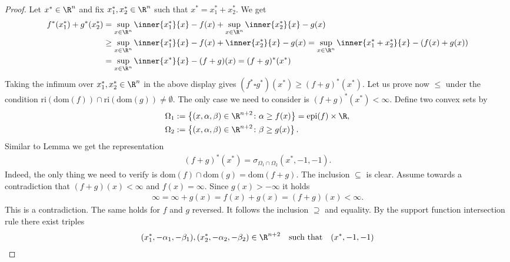 \begin{proof}
  Let $x^*\in\R^n$ and fix $x_1^*,x_2^*\in\R^n$ such that
  $x^*=x^*_1+x^*_2$.
  We get
  \begin{align*}
    f^*(x^*_1)+g^*(x^*_2)
    &=
    \sup_{x\in\R^n}
    \inner{x^*_1}{x}-f(x)
    +
    \sup_{x\in\R^n}
    \inner{x^*_2}{x}-g(x)
    \\
    &\ge
    \sup_{x\in\R^n}
    \inner{x^*_1}{x}-f(x)
    +
    \inner{x^*_2}{x}-g(x)
    =
    \sup_{x\in\R^n}
    \inner{x^*_1+x^*_2}{x}-(f(x)+g(x))
    \\
    &=
    \sup_{x\in\R^n}
    \inner{x^*}{x}-(f+g)(x)
    =(f+g)^*(x^*)
  \end{align*}
  Taking the infimum over $x_1^*,x_2^*\in\R^n$ in the above display gives 
  $
  (f^*\square g^*)(x^*)
  \ge
  (f+g)^*(x^*).
  $
  Let us prove now $\le$ under the condition
  $
  \text{ri}\left( \text{dom}(f) \right)
  \cap
  \text{ri}\left( \text{dom}(g) \right)
  \neq 
  \emptyset
  .
  $
  The only case we need to consider is
  $
    (f+g)^*(x^*)<\infty.
  $
  Define two convex sets by
  \begin{align}
    \Omega_1
    &:=
    \left\{ 
      (x,\alpha,\beta)\in\R^{n+2}
      \colon
      \alpha\ge f(x)
    \right\}
    =
    \mathrm{epi}(f)\times \R,
    \\
    \Omega_2
    &:=
    \left\{ 
      (x,\alpha,\beta)\in\R^{n+2}
      \colon
      \beta\ge g(x)
    \right\}.
  \end{align}
  Similar to Lemma we get the representation
  \begin{gather}
    (f+g)^*(x^*)
    =
    \sigma_{\Omega_1\cap\Omega_2}
    (x^*,-1,-1).
  \end{gather}
  Indeed, the only thing we need to verify is
  $
    \mathrm{dom}(f)\cap\mathrm{dom}(g)
    =
    \mathrm{dom}(f+g).
  $
  The inclusion $\subseteq$ is clear.
  Assume towards a contradiction that
  $
    (f+g)(x)<\infty
  $
  and
  $
    f(x)=\infty.
  $
  Since $g(x)>-\infty$ it holds
  \begin{gather}
    \infty
    =
    \infty+g(x)
    =f(x)+g(x)
    =(f+g)(x)
    <
    \infty.
  \end{gather}
  This is a contradiction. The same holds for $f$ and $g$ reversed. It follows the inclusion $\supseteq$ and equality.
  By the support function intersection rule there exist triples
  \begin{gather}
    (x^*_1,-\alpha_1,-\beta_1),
    (x^*_2,-\alpha_2,-\beta_2)
    \in \R^{n+2}
    \quad
    \text{such that}
    \quad
    (x^*,-1,-1)

\end{gather}
\end{proof}
